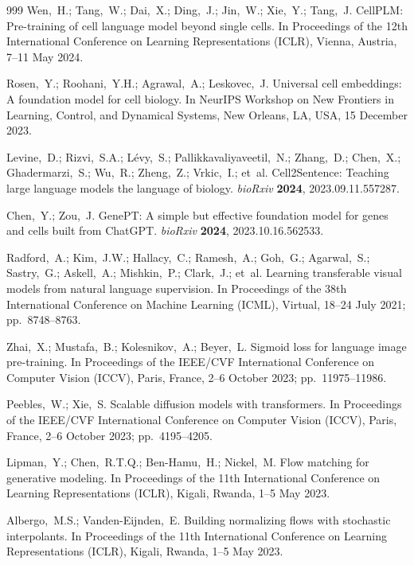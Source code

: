 \documentclass[preprint,12pt]{elsarticle}
\begin{document}
\begin{thebibliography}{999}
Wen,~H.; Tang,~W.; Dai,~X.; Ding,~J.; Jin,~W.; Xie,~Y.; Tang,~J. CellPLM: Pre-training of cell language model beyond single cells. In Proceedings of the 12th International Conference on Learning Representations (ICLR), Vienna, Austria, 7--11 May 2024.

Rosen,~Y.; Roohani,~Y.H.; Agrawal,~A.; Leskovec,~J. Universal cell embeddings: A foundation model for cell biology. In NeurIPS Workshop on New Frontiers in Learning, Control, and Dynamical Systems, New Orleans, LA, USA, 15 December 2023.

Levine,~D.; Rizvi,~S.A.; L\'{e}vy,~S.; Pallikkavaliyaveetil,~N.; Zhang,~D.; Chen,~X.; Ghadermarzi,~S.; Wu,~R.; Zheng,~Z.; Vrkic,~I.; et~al. Cell2Sentence: Teaching large language models the language of biology. {\em bioRxiv} {\bf 2024}, 2023.09.11.557287.

Chen,~Y.; Zou,~J. GenePT: A simple but effective foundation model for genes and cells built from ChatGPT. {\em bioRxiv} {\bf 2024}, 2023.10.16.562533.

Radford,~A.; Kim,~J.W.; Hallacy,~C.; Ramesh,~A.; Goh,~G.; Agarwal,~S.; Sastry,~G.; Askell,~A.; Mishkin,~P.; Clark,~J.; et~al. Learning transferable visual models from natural language supervision. In Proceedings of the 38th International Conference on Machine Learning (ICML), Virtual, 18--24 July 2021; pp.\ 8748--8763.

Zhai,~X.; Mustafa,~B.; Kolesnikov,~A.; Beyer,~L. Sigmoid loss for language image pre-training. In Proceedings of the IEEE/CVF International Conference on Computer Vision (ICCV), Paris, France, 2--6 October 2023; pp.\ 11975--11986.

Peebles,~W.; Xie,~S. Scalable diffusion models with transformers. In Proceedings of the IEEE/CVF International Conference on Computer Vision (ICCV), Paris, France, 2--6 October 2023; pp.\ 4195--4205.

Lipman,~Y.; Chen,~R.T.Q.; Ben-Hamu,~H.; Nickel,~M. Flow matching for generative modeling. In Proceedings of the 11th International Conference on Learning Representations (ICLR), Kigali, Rwanda, 1--5 May 2023.

Albergo,~M.S.; Vanden-Eijnden,~E. Building normalizing flows with stochastic interpolants. In Proceedings of the 11th International Conference on Learning Representations (ICLR), Kigali, Rwanda, 1--5 May 2023.


\end{thebibliography}
\end{document}
